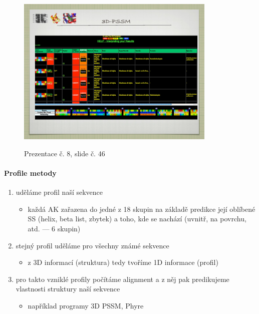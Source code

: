 \documentclass[DIV=8]{scrreprt}
\begin{document}
\begin{figure}
    \caption{Prezentace č. 8, slide č. 46}
    \includegraphics[width=0.85\textwidth]{slides-8/slide-46.jpg}
    \centering
    \label{slides-8-slide-46}
\end{figure}

\paragraph{Profile metody}
\begin{enumerate}[nosep]
    \item uděláme profil naší sekvence
\begin{itemize}[nosep]
    \item každá AK zařazena do jedné z 18 skupin na základě predikce její oblíbené SS (helix, beta list, zbytek) a toho, kde se nachází (uvnitř, na povrchu, atd. --- 6 skupin)
\end{itemize}

    \item stejný profil uděláme pro všechny známé sekvence
\begin{itemize}[nosep]
    \item z 3D informací (struktura) tedy tvoříme 1D informace (profil)
\end{itemize}

    \item pro takto vzniklé profily počítáme alignment a z něj pak predikujeme vlastnosti struktury naší sekvence
\begin{itemize}[nosep]
    \item například programy 3D PSSM, Phyre
\end{itemize}

\end{enumerate}
\end{document}

